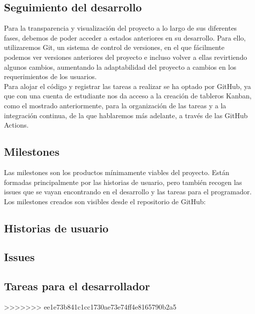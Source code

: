 \subsection{Seguimiento del desarrollo}
Para la transparencia y visualización del proyecto a lo largo de sus diferentes fases, debemos de poder acceder a estados anteriores en su desarrollo. Para ello, utilizaremos Git, un sistema de control de versiones, en el que fácilmente podemos ver versiones anteriores del proyecto e incluso volver a ellas revirtiendo algunos cambios, aumentando la adaptabilidad del proyecto a cambios en los requerimientos de los usuarios.\\

Para alojar el código y registrar las tareas a realizar se ha optado por GitHub, ya que con una cuenta de estudiante nos da acceso a la creación de tableros Kanban, como el mostrado anteriormente, para la organización de las tareas y a la integración continua, de la que hablaremos más adelante, a través de las GitHub Actions.

\subsection{Milestones}
Las milestones son los productos mínimamente viables del proyecto. Están formadas principalmente por las historias de usuario, pero también recogen las issues que se vayan encontrando en el desarrollo y las tareas para el programador.\\

Los milestones creados son visibles desde el repositorio de GitHub:

\subsection{Historias de usuario}

\subsection{Issues}

\subsection{Tareas para el desarrollador}
>>>>>>> ee1e73b841c1cc1730ae73e74ff4e8165790b2a5
